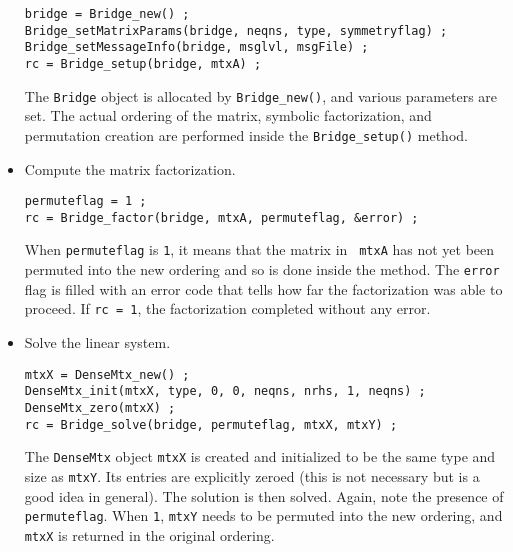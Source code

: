 \begin{itemize}
\begin{verbatim}
bridge = Bridge_new() ;
Bridge_setMatrixParams(bridge, neqns, type, symmetryflag) ;
Bridge_setMessageInfo(bridge, msglvl, msgFile) ;
rc = Bridge_setup(bridge, mtxA) ;
\end{verbatim}
The {\tt Bridge} object is allocated by {\tt Bridge\_new()},
and various parameters are set.
The actual ordering of the matrix, symbolic factorization,
and permutation creation are performed inside the {\tt Bridge\_setup()}
method.
%
\item Compute the matrix factorization.
\begin{verbatim}
permuteflag = 1 ;
rc = Bridge_factor(bridge, mtxA, permuteflag, &error) ;
\end{verbatim}
When {\tt permuteflag} is {\tt 1}, it means that the matrix in {\tt
mtxA} has not yet been permuted into the new ordering and so is
done inside the method.
The {\tt error} flag is filled with an error code that tells how far the
factorization was able to proceed.
If {\tt rc = 1}, the factorization completed without any error.
%
\item Solve the linear system.
\begin{verbatim}
mtxX = DenseMtx_new() ;
DenseMtx_init(mtxX, type, 0, 0, neqns, nrhs, 1, neqns) ;
DenseMtx_zero(mtxX) ;
rc = Bridge_solve(bridge, permuteflag, mtxX, mtxY) ;
\end{verbatim}
The {\tt DenseMtx} object {\tt mtxX} is created and initialized to be
the same type and size as {\tt mtxY}.
Its entries are explicitly zeroed (this is not necessary but is a good
idea in general).
The solution is then solved.
Again, note the presence of {\tt permuteflag}.
When {\tt 1}, \texttt{mtxY} needs to be permuted into the new ordering,
and \texttt{mtxX} is returned in the original ordering.
\end{itemize}
\par
